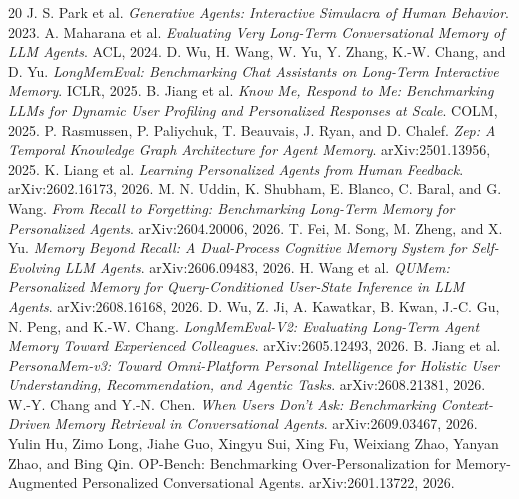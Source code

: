 \documentclass[10pt]{article}
\begin{document}
\begin{thebibliography}{20}
 J. S. Park et al. \emph{Generative Agents: Interactive Simulacra of Human Behavior}. 2023.
 A. Maharana et al. \emph{Evaluating Very Long-Term Conversational Memory of LLM Agents}. ACL, 2024.
 D. Wu, H. Wang, W. Yu, Y. Zhang, K.-W. Chang, and D. Yu. \emph{LongMemEval: Benchmarking Chat Assistants on Long-Term Interactive Memory}. ICLR, 2025.
 B. Jiang et al. \emph{Know Me, Respond to Me: Benchmarking LLMs for Dynamic User Profiling and Personalized Responses at Scale}. COLM, 2025.
 P. Rasmussen, P. Paliychuk, T. Beauvais, J. Ryan, and D. Chalef. \emph{Zep: A Temporal Knowledge Graph Architecture for Agent Memory}. arXiv:2501.13956, 2025.
 K. Liang et al. \emph{Learning Personalized Agents from Human Feedback}. arXiv:2602.16173, 2026.
 M. N. Uddin, K. Shubham, E. Blanco, C. Baral, and G. Wang. \emph{From Recall to Forgetting: Benchmarking Long-Term Memory for Personalized Agents}. arXiv:2604.20006, 2026.
 T. Fei, M. Song, M. Zheng, and X. Yu. \emph{Memory Beyond Recall: A Dual-Process Cognitive Memory System for Self-Evolving LLM Agents}. arXiv:2606.09483, 2026.
 H. Wang et al. \emph{QUMem: Personalized Memory for Query-Conditioned User-State Inference in LLM Agents}. arXiv:2608.16168, 2026.
 D. Wu, Z. Ji, A. Kawatkar, B. Kwan, J.-C. Gu, N. Peng, and K.-W. Chang. \emph{LongMemEval-V2: Evaluating Long-Term Agent Memory Toward Experienced Colleagues}. arXiv:2605.12493, 2026.
 B. Jiang et al. \emph{PersonaMem-v3: Toward Omni-Platform Personal Intelligence for Holistic User Understanding, Recommendation, and Agentic Tasks}. arXiv:2608.21381, 2026.
 W.-Y. Chang and Y.-N. Chen. \emph{When Users Don't Ask: Benchmarking Context-Driven Memory Retrieval in Conversational Agents}. arXiv:2609.03467, 2026.
 Yulin Hu, Zimo Long, Jiahe Guo, Xingyu Sui, Xing Fu, Weixiang Zhao, Yanyan Zhao, and Bing Qin. OP-Bench: Benchmarking Over-Personalization for Memory-Augmented Personalized Conversational Agents. arXiv:2601.13722, 2026.
\end{thebibliography}
\end{document}
